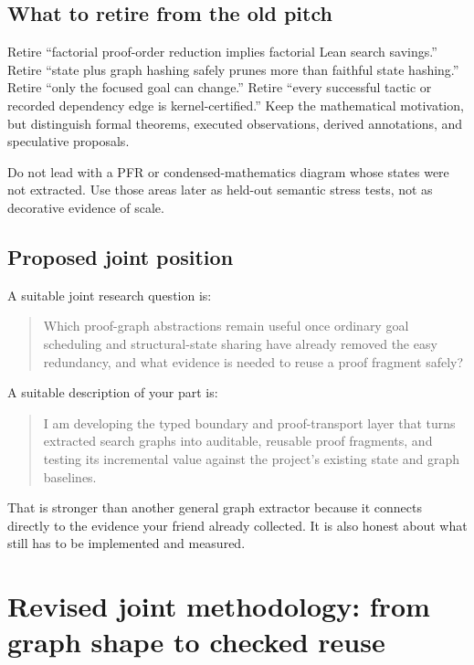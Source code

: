 \documentclass[
  10pt,
]{article}
\begin{document}
\subsection{What to retire from the old
pitch}\label{what-to-retire-from-the-old-pitch}

Retire ``factorial proof-order reduction implies factorial Lean search
savings.'' Retire ``state plus graph hashing safely prunes more than
faithful state hashing.'' Retire ``only the focused goal can change.''
Retire ``every successful tactic or recorded dependency edge is
kernel-certified.'' Keep the mathematical motivation, but distinguish
formal theorems, executed observations, derived annotations, and
speculative proposals.

Do not lead with a PFR or condensed-mathematics diagram whose states
were not extracted. Use those areas later as held-out semantic stress
tests, not as decorative evidence of scale.

\subsection{Proposed joint position}\label{proposed-joint-position}

A suitable joint research question is:

\begin{quote}
Which proof-graph abstractions remain useful once ordinary goal
scheduling and structural-state sharing have already removed the easy
redundancy, and what evidence is needed to reuse a proof fragment
safely?
\end{quote}

A suitable description of your part is:

\begin{quote}
I am developing the typed boundary and proof-transport layer that turns
extracted search graphs into auditable, reusable proof fragments, and
testing its incremental value against the project's existing state and
graph baselines.
\end{quote}

That is stronger than another general graph extractor because it
connects directly to the evidence your friend already collected. It is
also honest about what still has to be implemented and measured.

\section{Revised joint methodology: from graph shape to checked
reuse}\label{revised-joint-methodology-from-graph-shape-to-checked-reuse}
\end{document}
